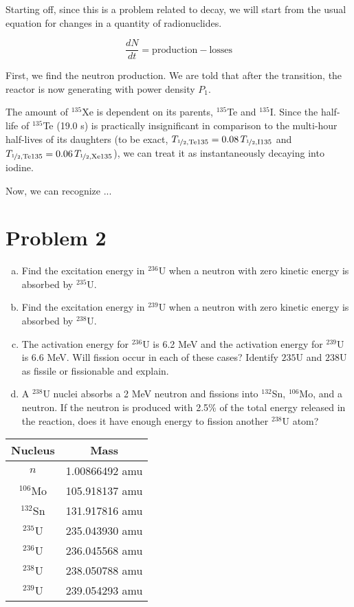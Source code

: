 \documentclass{report}
\newcommand{\tab}{\-\hspace{1.5cm}}
\begin{document}
Starting off, since this is a problem related to decay, we will start from the usual equation for changes in a quantity of radionuclides.

$$ \frac{dN}{dt} = \text{production} - \text{losses} $$

First, we find the neutron production. We are told that after the transition, the reactor is now generating with power density $P_1$. 

The amount of $^{135}$Xe is dependent on its parents, $^{135}$Te and $^{135}$I. Since the half-life of $^{135}$Te (19.0 s) is practically insignificant in comparison to the multi-hour half-lives of its daughters (to be exact, $T_{\nicefrac{1}{2},\text{Te135}} = 0.08\,T_{\nicefrac{1}{2},\text{I135}}$ and $T_{\nicefrac{1}{2},\text{Te135}} = 0.06\,T_{\nicefrac{1}{2},\text{Xe135}}$), we can treat it as instantaneously decaying into iodine.

Now, we can recognize ...



\newpage
\section*{Problem 2}

\begin{enumerate}[a)]
\item Find the excitation energy in $^{236}$U when a neutron with zero kinetic energy is absorbed by $^{235}$U. 
\item Find the excitation energy in $^{239}$U when a neutron with zero kinetic energy is absorbed by $^{238}$U. 
\item The activation energy for $^{236}$U is 6.2 MeV and the activation energy for $^{239}$U is 6.6 MeV. Will fission occur in each of these cases? Identify ${235}$U and ${238}$U as fissile or fissionable and explain.
\item A $^{238}$U nuclei absorbs a 2 MeV neutron and fissions into $^{132}$Sn, $^{106}$Mo, and a neutron. If the neutron is produced with 2.5\% of the total energy released in the reaction, does it have enough energy to fission another $^{238}$U atom?
\end{enumerate}

\begin{table}[htbp]
	\centering
	\begin{tabular}{|c|c|}
			\hline
			Nucleus		&	\tab\- Mass \tab\- \\
			\hline	
			$n$			&  1.00866492 amu \\
			$^{106}$Mo	&  105.918137 amu \\
			$^{132}$Sn	&  131.917816 amu \\
			$^{235}$U	&  235.043930 amu \\
			$^{236}$U	&  236.045568 amu \\	
			$^{238}$U	&  238.050788 amu \\
			$^{239}$U	&  239.054293 amu \\
			\hline
	\end{tabular}
	\label{tab:design-specs}
\end{table}
\end{document}
